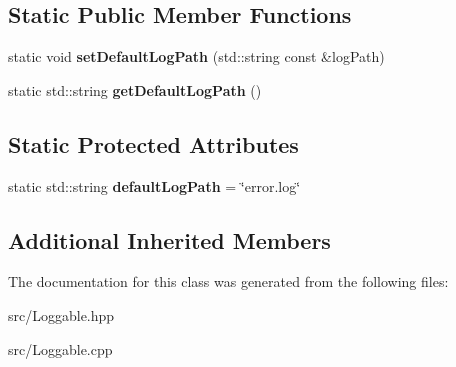 \subsection*{Static Public Member Functions}
\begin{DoxyCompactItemize}
\item 
\hypertarget{classstb_1_1Loggable__Error_a065b764e8d67bd61a465cc1692209491}{static void {\bfseries set\+Default\+Log\+Path} (std\+::string const \&log\+Path)}\label{classstb_1_1Loggable__Error_a065b764e8d67bd61a465cc1692209491}

\item 
\hypertarget{classstb_1_1Loggable__Error_ac700f9544500c4f19950b5b85c327af2}{static std\+::string {\bfseries get\+Default\+Log\+Path} ()}\label{classstb_1_1Loggable__Error_ac700f9544500c4f19950b5b85c327af2}

\end{DoxyCompactItemize}
\subsection*{Static Protected Attributes}
\begin{DoxyCompactItemize}
\item 
\hypertarget{classstb_1_1Loggable__Error_a92e4581ef7d69bab1df57f2cfab9124c}{static std\+::string {\bfseries default\+Log\+Path} = \char`\"{}error.\+log\char`\"{}}\label{classstb_1_1Loggable__Error_a92e4581ef7d69bab1df57f2cfab9124c}

\end{DoxyCompactItemize}
\subsection*{Additional Inherited Members}


The documentation for this class was generated from the following files\+:\begin{DoxyCompactItemize}
\item 
src/Loggable.\+hpp\item 
src/Loggable.\+cpp\end{DoxyCompactItemize}
